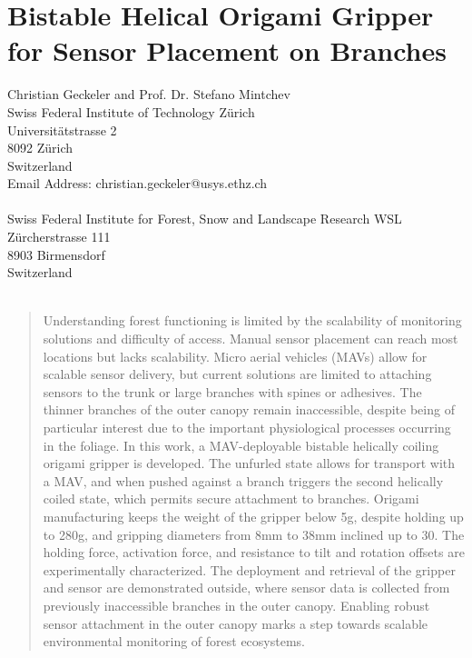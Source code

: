 \chapter{Bistable Helical Origami Gripper for Sensor Placement on Branches}
\label{ch:origami_gripper}

\author{Christian Geckeler*}
\author{Stefano Mintchev}

\begin{affiliations}
Christian Geckeler and Prof. Dr. Stefano Mintchev\\
Swiss Federal Institute of Technology Zürich\\
Universitätstrasse 2\\
8092 Zürich\\
Switzerland\\
Email Address: christian.geckeler@usys.ethz.ch\\~\\ %

Swiss Federal Institute for Forest, Snow and Landscape Research WSL\\
Zürcherstrasse 111\\
8903 Birmensdorf\\
Switzerland\\~\\

\end{affiliations}


\begin{abstract} %
Understanding forest functioning is limited by the scalability of monitoring solutions and difficulty of access. Manual sensor placement can reach most locations but lacks scalability. Micro aerial vehicles (MAVs) allow for scalable sensor delivery, but current solutions are limited to attaching sensors to the trunk or large branches with spines or adhesives. The thinner branches of the outer canopy remain inaccessible, despite being of particular interest due to the important physiological processes occurring in the foliage. In this work, a MAV-deployable bistable helically coiling origami gripper is developed. The unfurled state allows for transport with a MAV, and when pushed against a branch triggers the second helically coiled state, which permits secure attachment to branches. Origami manufacturing keeps the weight of the gripper below 5g, despite holding up to 280g, and gripping diameters from 8mm to 38mm inclined up to 30\degree. The holding force, activation force, and resistance to tilt and rotation offsets are experimentally characterized. The deployment and retrieval of the gripper and sensor are demonstrated outside, where sensor data is collected from previously inaccessible branches in the outer canopy. Enabling robust sensor attachment in the outer canopy marks a step towards scalable environmental monitoring of forest ecosystems.

 
\end{abstract}


